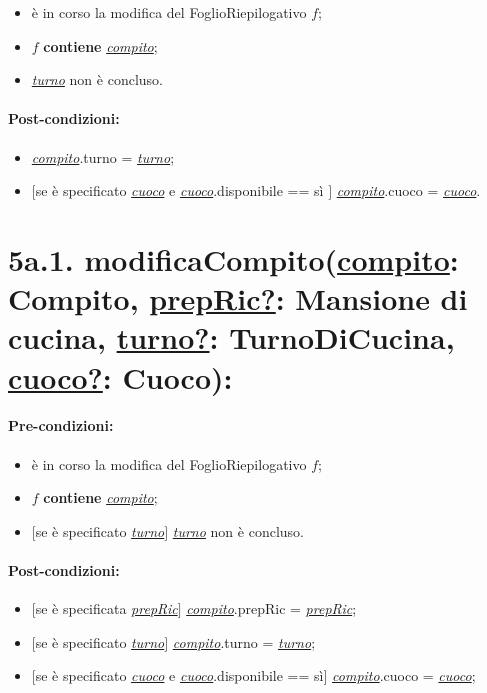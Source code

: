\begin{itemize}
  \item è in corso la modifica del FoglioRiepilogativo $f$;
  \item $f$ \textbf{contiene} \underline{\textit{compito}};
  \item \underline{\textit{turno}} non è concluso.
\end{itemize}

\paragraph{Post-condizioni:}

\begin{itemize}
  \item \underline{\textit{compito}}.turno = \underline{\textit{turno}};
  \item $[$se è specificato \underline{\textit{cuoco}} e \underline{\textit{cuoco}}.disponibile == sì $]$ \underline{\textit{compito}}.cuoco = \underline{\textit{cuoco}}.
\end{itemize}

\section*{5a.1. modificaCompito(\underline{compito}: Compito, \underline{prepRic?}: Mansione di cucina, \underline{turno?}: TurnoDiCucina, \underline{cuoco?}: Cuoco):}

\paragraph{Pre-condizioni:}

\begin{itemize}
  \item è in corso la modifica del FoglioRiepilogativo $f$;
  \item $f$ \textbf{contiene} \underline{\textit{compito}};
  \item $[$se è specificato \underline{\textit{turno}}$]$ \underline{\textit{turno}} non è concluso.
\end{itemize}

\paragraph{Post-condizioni:}

\begin{itemize}
  \item $[$se è specificata \underline{\textit{prepRic}}$]$ \underline{\textit{compito}}.prepRic = \underline{\textit{prepRic}};
  \item $[$se è specificato \underline{\textit{turno}}$]$ \underline{\textit{compito}}.turno = \underline{\textit{turno}};
  \item $[$se è specificato \underline{\textit{cuoco}} e \underline{\textit{cuoco}}.disponibile == sì$]$ \underline{\textit{compito}}.cuoco = \underline{\textit{cuoco}};
\end{itemize}

